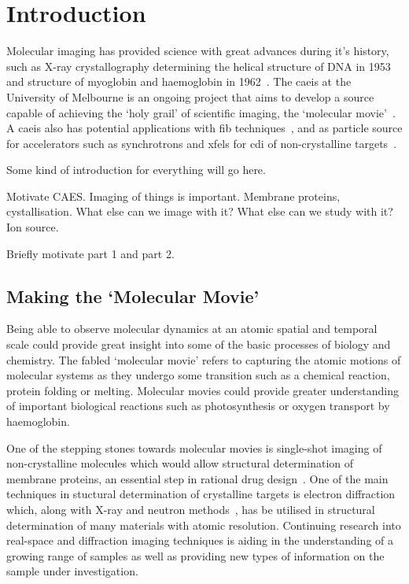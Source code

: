  \chapter{Introduction}
 
\setcounter{page}{1}

Molecular imaging has provided science with great advances during it's history, such as X-ray crystallography determining the helical structure of DNA in 1953~\cite{watson_molecular_1953} and structure of myoglobin and haemoglobin in 1962~\cite{kendrew_x-ray_1957}.
The \gls{caeis} at the University of Melbourne is an ongoing project that aims to develop a source capable of achieving the `holy grail' of scientific imaging, the `molecular movie'~\cite{dwyer_femtosecond_2006,sciaini_femtosecond_2011}.
A \gls{caeis} also has potential applications with \gls{fib} techniques~\cite{mcclelland_bright_2016}, and as particle source for accelerators such as synchrotrons and \glspl{xfel} for \gls{cdi} of non-crystalline targets~\cite{van_oudheusden_electron_2007, zhu_future_2015, mcculloch_cold_2016}.



{\color{red}
Some kind of introduction for everything will go here.

Motivate CAES. Imaging of things is important. Membrane proteins, cystallisation. What else can we image with it? What else can we study with it? Ion source.

Briefly motivate part 1 and part 2.}

\section{Making the `Molecular Movie'}

Being able to observe molecular dynamics at an atomic spatial and temporal scale could provide great insight into some of the basic processes of biology and chemistry.
The fabled `molecular movie' refers to capturing the atomic motions of molecular systems as they undergo some transition such as a chemical reaction, protein folding or melting.
Molecular movies could provide greater understanding of important biological reactions such as photosynthesis or oxygen transport by haemoglobin.

One of the stepping stones towards molecular movies is single-shot imaging of non-crystalline molecules which would allow structural determination of membrane proteins, an essential step in rational drug design~\cite{hardy_atomic_1987, barrett_discovering_1999, pinto_influenza_1992}.
One of the main techniques in stuctural determination of crystalline targets is electron diffraction which, along with X-ray and neutron methods~\cite{cullity_elements_2001,bacon_x-ray_2013}, has be utilised in structural determination of many materials with atomic resolution.
Continuing research into real-space and diffraction imaging techniques is aiding in the understanding of a growing range of samples as well as providing new types of information on the sample under investigation.

